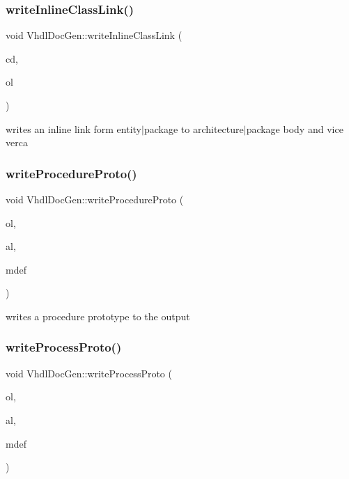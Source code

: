\subsubsection{\texorpdfstring{writeInlineClassLink()}{writeInlineClassLink()}}
{\footnotesize\ttfamily void Vhdl\+Doc\+Gen\+::write\+Inline\+Class\+Link (\begin{DoxyParamCaption}\item[{const \mbox{\hyperlink{class_class_def}{Class\+Def}} $\ast$}]{cd,  }\item[{\mbox{\hyperlink{class_output_list}{Output\+List}} \&}]{ol }\end{DoxyParamCaption})\hspace{0.3cm}{\ttfamily [static]}}

writes an inline link form entity$\vert$package to architecture$\vert$package body and vice verca \mbox{\label{class_vhdl_doc_gen_a94da80078b9bba291b1c1af056eca6a4}} 
\subsubsection{\texorpdfstring{writeProcedureProto()}{writeProcedureProto()}}
{\footnotesize\ttfamily void Vhdl\+Doc\+Gen\+::write\+Procedure\+Proto (\begin{DoxyParamCaption}\item[{\mbox{\hyperlink{class_output_list}{Output\+List}} \&}]{ol,  }\item[{const \mbox{\hyperlink{class_argument_list}{Argument\+List}} $\ast$}]{al,  }\item[{const \mbox{\hyperlink{class_member_def}{Member\+Def}} $\ast$}]{mdef }\end{DoxyParamCaption})\hspace{0.3cm}{\ttfamily [static]}}

writes a procedure prototype to the output \mbox{\label{class_vhdl_doc_gen_a94ad80db8536156393a701496506c052}} 
\subsubsection{\texorpdfstring{writeProcessProto()}{writeProcessProto()}}
{\footnotesize\ttfamily void Vhdl\+Doc\+Gen\+::write\+Process\+Proto (\begin{DoxyParamCaption}\item[{\mbox{\hyperlink{class_output_list}{Output\+List}} \&}]{ol,  }\item[{const \mbox{\hyperlink{class_argument_list}{Argument\+List}} $\ast$}]{al,  }\item[{const \mbox{\hyperlink{class_member_def}{Member\+Def}} $\ast$}]{mdef }\end{DoxyParamCaption})\hspace{0.3cm}{\ttfamily [static]}}

